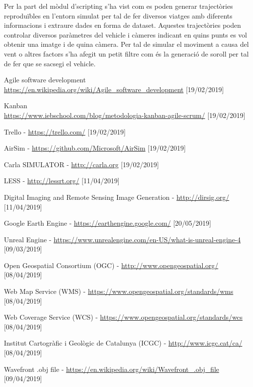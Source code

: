 \documentclass[10pt,a4paper,twocolumn,twoside]{article}
\begin{document}
Per la part del mòdul d'scripting s'ha vist com es poden generar trajectòries reproduïbles en l'entorn simulat per tal de fer diversos viatges amb diferents informacions i extraure dades en forma de dataset. Aquestes trajectòries poden controlar diversos paràmetres del vehicle i càmeres indicant en quins punts es vol obtenir una imatge i de quina càmera. Per tal de simular el moviment a causa del vent o altres factors s'ha afegit un petit filtre com és la generació de soroll per tal de fer que se sacsegi el vehicle.


\begin{thebibliography}{11}
Agile software development
\\ \url{https://en.wikipedia.org/wiki/Agile_software_development}
[19/02/2019]

Kanban
\\ \url{https://www.iebschool.com/blog/metodologia-kanban-agile-scrum/} [19/02/2019]

Trello - \url{https://trello.com/} [19/02/2019]

AirSim - \url{https://github.com/Microsoft/AirSim} [19/02/2019]

Carla SIMULATOR - \url{http://carla.org} [19/02/2019]

LESS - \url{http://lessrt.org/} [11/04/2019]

Digital Imaging and Remote Sensing Image Generation - \url{http://dirsig.org/} [11/04/2019]

Google Earth Engine - \url{https://earthengine.google.com/} [20/05/2019]

Unreal Engine - \url{https://www.unrealengine.com/en-US/what-is-unreal-engine-4} [09/03/2019]

Open Geospatial Consortium (OGC) -  \url{http://www.opengeospatial.org/} [08/04/2019]

Web Map Service (WMS) -  \url{https://www.opengeospatial.org/standards/wms} [08/04/2019]

Web Coverage Service (WCS) -  \url{https://www.opengeospatial.org/standards/wcs} [08/04/2019]

Institut Cartogràfic i Geològic de Catalunya (ICGC) - \url{http://www.icgc.cat/ca/} [08/04/2019]

Wavefront .obj file - \url{https://en.wikipedia.org/wiki/Wavefront_.obj_file} [09/04/2019]


\end{thebibliography}
\end{document}
